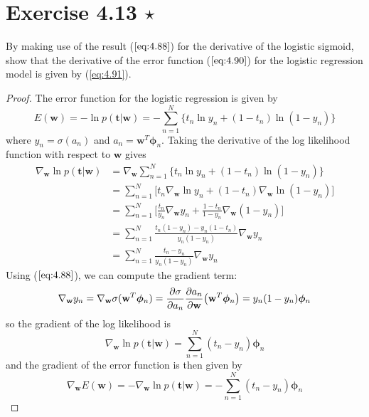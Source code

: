 \section*{Exercise 4.13 $\star$}
By making use of the result ($\ref{eq:4.88}$) for the derivative of the logistic
sigmoid, show that the derivative of the error function ($\ref{eq:4.90}$) for 
the logistic regression model is given by (\ref{eq:4.91}).

\vspace{1em}

\begin{proof}
    The error function for the logistic regression is given by
    \begin{equation*}
        E(\mathbf{w}) 
        = -\ln p(\mathbf{t} | \mathbf{w})
        = -\sum_{n = 1}^{N} \{t_n \ln y_n + (1 - t_n) \ln(1 - y_n)\} 
        \tag{4.90}\label{eq:4.90}
    \end{equation*}
    where $y_n = \sigma(a_n)$ and $a_n = \mathbf{w}^T\bm{\phi}_n$.
    Taking the derivative of the log likelihood function with respect to $\mathbf{w}$
    gives
    \begin{align*}
        \nabla_{\mathbf{w}} \ln p(\mathbf{t} | \mathbf{w})
        &= \nabla_{\mathbf{w}} \sum_{n=1}^{N} \big\{
            t_n \ln y_n 
            + (1 - t_n) \ln (1 - y_n)
            \big\} \\
        &= \sum_{n=1}^{N} \bigg[t_n \nabla_{\mathbf{w}} \ln y_n
            + (1 - t_n) \nabla_{\mathbf{w}} \ln (1 - y_n)\bigg] \\
        &= \sum_{n=1}^{N} \bigg[\frac{t_n}{y_n} \nabla_{\mathbf{w}} y_n
            + \frac{1 - t_n}{1 - y_n} \nabla_{\mathbf{w}} (1 - y_n) \bigg]\\
        &= \sum_{n=1}^{N} \frac{t_n(1 - y_n) - y_n(1 - t_n)}{y_n(1 - y_n)}
            \nabla_\mathbf{w} y_n \\
        &= \sum_{n=1}^{N} \frac{t_n - y_n}{y_n(1 - y_n)}
            \nabla_\mathbf{w} y_n \tag{4.13.1}\label{eq:4.13.1}
    \end{align*}
    Using ($\ref{eq:4.88}$), we can compute the gradient term:
    \begin{align*}
        \nabla_{\mathbf{w}} y_n 
        = \nabla_\mathbf{w} \sigma(\mathbf{w}^T\bm{\phi}_n)
        = \pdv{\sigma}{a_n} \pdv{a_n}{\mathbf{w}} \big(\mathbf{w}^T\bm{\phi}_n\big)
        = y_n(1 - y_n) \bm{\phi}_n
    \end{align*}
    so the gradient of the log likelihood is
    \[
        \nabla_{\mathbf{w}} \ln p(\mathbf{t} | \mathbf{w})
        = \sum_{n=1}^{N} (t_n - y_n) \bm{\phi}_n
    \] 
    and the gradient of the error function is then given by
    \begin{equation*}
        \nabla_\mathbf{w} E(\mathbf{w})
        = -\nabla_\mathbf{w} \ln p(\mathbf{t} | \mathbf{w})
        = - \sum_{n=1}^{N} (t_n - y_n) \bm{\phi}_n
        \tag{4.91}\label{eq:4.91}
    \end{equation*}
\end{proof}

